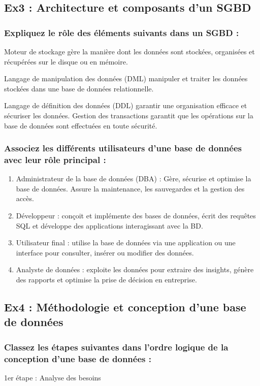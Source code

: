\documentclass{article}
\begin{document}
\subsection{Ex3 : Architecture et composants d’un SGBD}
\subsubsection{Expliquez le rôle des éléments suivants dans un SGBD :}
Moteur de stockage gère la manière dont les données sont stockées, organisées et récupérées sur le 
disque ou en mémoire. 

Langage de manipulation des données (DML) manipuler et traiter les données stockées dans une 
base de données relationnelle.  

Langage de définition des données (DDL) garantir une organisation efficace et sécuriser les 
données. 
Gestion des transactions garantit que les opérations sur la base de données sont effectuées en toute 
sécurité.  

\subsubsection{Associez les différents utilisateurs d’une base de données avec leur rôle principal :}

\begin{enumerate}
  \item Administrateur de la base de données (DBA) : Gère, sécurise et optimise la base de données. 
Assure la maintenance, les sauvegardes et la gestion des accès. 
  \item Développeur : conçoit et implémente des bases de données, écrit des requêtes SQL et 
développe des applications interagissant avec la BD. 
  \item Utilisateur final : utilise la base de données via une application ou une interface pour 
consulter, insérer ou modifier des données. 
  \item Analyste de données : exploite les données pour extraire des insights, génère des rapports et 
optimise la prise de décision en entreprise. 
\end{enumerate}

\subsection{Ex4 : Méthodologie et conception d’une base de données}
\subsubsection{Classez les étapes suivantes dans l’ordre logique de la conception d’une base de données :}
1er étape : Analyse des besoins         %
\end{document}
